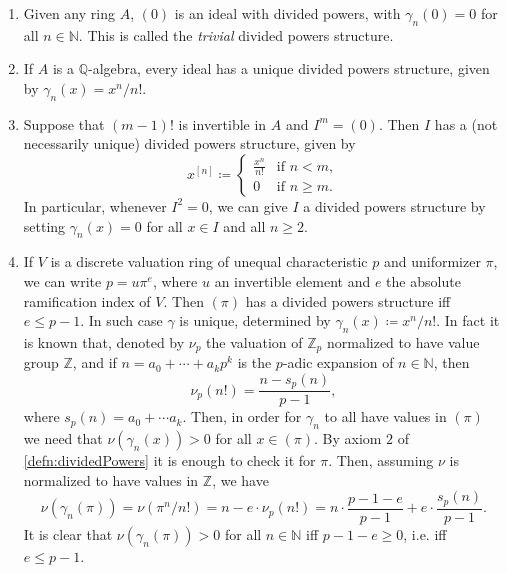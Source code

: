 \begin{ex}\leavevmode\vspace{-.2\baselineskip}
\begin{enumerate}\label{PDexamples}
	\item Given any ring $A$, $(0)$ is an ideal with divided powers,
		with $\gamma_n(0) = 0$ for all $n \in \mathbb{N}$.
		This is called the {\em trivial} divided powers structure.

	\item If $A$ is a $\mathbb{Q}$-algebra, every ideal has a unique
		divided powers structure, given by $\gamma_n(x) = x^n/n!$.

	\item Suppose that $\left( m-1 \right)!$ is invertible in $A$ and 
		$I^m = (0)$.
		Then $I$ has a (not necessarily unique) divided powers structure, given by
		\begin{equation*}
			x^{[n]} \coloneqq
			\begin{cases}
				\frac{ x^n }{ n! } & \text{if } n < m,\\
				0 & \text{if } n \geq m.
			\end{cases} 
		\end{equation*}
		In particular, whenever $I^2 = 0$, we can give $I$ a
		divided powers structure by setting $\gamma_n(x) = 0$
		for all $x \in I$ and all $n \geq 2$.

	\item\label{PDex:DVR} If $V$ is a discrete valuation ring of unequal characteristic $p$
		and uniformizer $\pi$, we can write $p = u \pi^e$,
		where $u$ an invertible element and $e$ the absolute ramification
		index of $V$.
		Then $\left( \pi \right)$ has a divided powers structure iff $e \leq p-1$.
		In such case $\gamma$ is unique, determined by
		$\gamma_n(x) \coloneqq x^n/n!$.
		In fact it is known that, denoted by $\nu_p$ the valuation
		of $\mathbb{Z}_{p}$ normalized to have value group $\mathbb{Z}$,
		and if $n = a_0 + \cdots + a_kp^k$ is the $p$-adic expansion
		of $n \in \mathbb{N}$, then
		\begin{equation*}
			\nu_p(n!) = 
			\frac{n - s_p(n)}{p-1}
		,\end{equation*}
		where $s_p(n) = a_0 + \cdots a_k$.
		Then, in order for $\gamma_n$ to all have values in $(\pi)$
		we need that $\nu(\gamma_n(x)) > 0$ for all $x \in (\pi)$.
		By axiom $2$ of \cref{defn:dividedPowers}
		it is enough to check it for $\pi$.
		Then, assuming $\nu$ is normalized to have values in $\mathbb{Z}$,
		we have
		\begin{equation*}
			\nu(\gamma_n(\pi)) = \nu(\pi^n/n!) =
			n - e \cdot \nu_p(n!) =
			n \cdot \frac{p - 1 - e}{p - 1} + e \cdot \frac{s_p(n)}{p - 1}
		.\end{equation*}
		It is clear that $\nu(\gamma_n(\pi)) > 0$ for all $n \in \mathbb{N}$
		iff $p - 1 - e \geq 0$, i.e. iff $e \leq p - 1$.
\end{enumerate}
\end{ex} 


